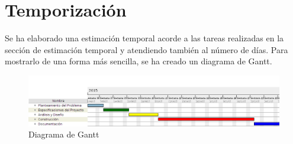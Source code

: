 \section{Temporización}
Se ha elaborado una estimación temporal acorde a las tareas realizadas en la sección de estimación temporal y atendiendo también al número de días. Para mostrarlo de una forma más sencilla, se ha creado un diagrama de Gantt.

\begin{figure}[htb]
\centering
\includegraphics[width=1\textwidth]{./imagenes/proyectoGantt}
\caption{Diagrama de Gantt} \label{fig:proyectoGantt}
\end{figure}
